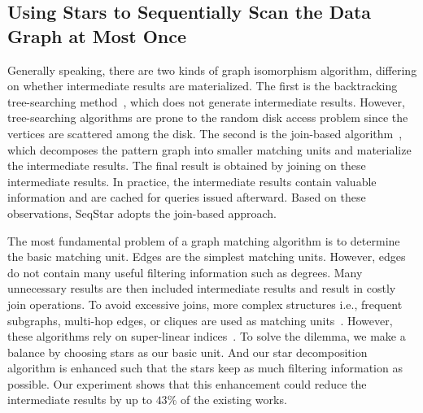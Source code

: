\subsection{Using Stars to Sequentially Scan the Data Graph at Most Once}\label{sec:match_star}
Generally speaking, there are two kinds of graph isomorphism algorithm,
differing on whether intermediate results are materialized.
The first is the backtracking tree-searching method~\cite{DBLP:journals/jacm/Ullmann76,DBLP:journals/pvldb/LeeHKL12,DBLP:conf/sigmod/HanLL13,DBLP:conf/sigmod/KimLBHLKJ16},
which does not generate intermediate results.
However, tree-searching algorithms are prone to the random disk access problem since the vertices are scattered among the disk.
The second is the join-based algorithm~\cite{DBLP:journals/pvldb/LaiQLC15,DBLP:journals/pvldb/QiaoZC17,DBLP:journals/pvldb/SunWWSL12,DBLP:journals/pvldb/MhedhbiS19},
which decomposes the pattern graph into smaller matching units and materialize the intermediate results.
The final result is obtained by joining on these intermediate results.
In practice, the intermediate results contain valuable information and are cached for queries issued afterward.
Based on these observations, SeqStar adopts the join-based approach.

The most fundamental problem of a graph matching algorithm is to determine the basic matching unit.
Edges are the simplest matching units.
However, edges do not contain many useful filtering information such as degrees.
Many unnecessary results are then included intermediate results and result in costly join operations.
To avoid excessive joins, more complex structures i.e.,
frequent subgraphs, multi-hop edges, or cliques are used as matching units~\cite{DBLP:conf/sigmod/HeS08,DBLP:conf/edbt/ZhangLY09,DBLP:journals/pvldb/QiaoZC17}.
However, these algorithms rely on super-linear indices~\cite{DBLP:journals/pvldb/SunWWSL12}.
To solve the dilemma, we make a balance by choosing stars as our basic unit.
And our star decomposition algorithm is enhanced such that the stars keep as much filtering information as possible.
Our experiment shows that this enhancement could reduce the intermediate results by up to $43\%$ of the existing works.

